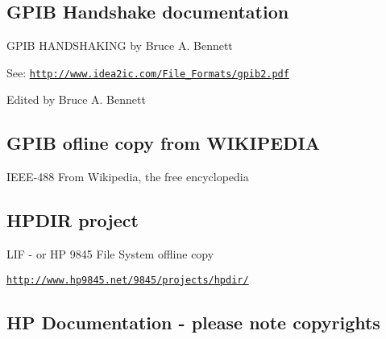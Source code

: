 \subsection*{G\+P\+IB Handshake documentation}


\begin{DoxyItemize}
\item G\+P\+IB H\+A\+N\+D\+S\+H\+A\+K\+I\+NG by Bruce A. Bennett
\begin{DoxyItemize}
\item See\+: \href{http://www.idea2ic.com/File_Formats/gpib2.pdf}{\tt http\+://www.\+idea2ic.\+com/\+File\+\_\+\+Formats/gpib2.\+pdf}
\begin{DoxyItemize}
\item Edited by Bruce A. Bennett 


\end{DoxyItemize}
\end{DoxyItemize}
\end{DoxyItemize}

\subsection*{G\+P\+IB ofline copy from W\+I\+K\+I\+P\+E\+D\+IA}


\begin{DoxyItemize}
\item I\+E\+E\+E-\/488 From Wikipedia, the free encyclopedia 


\end{DoxyItemize}

\subsection*{H\+P\+D\+IR project}


\begin{DoxyItemize}
\item L\+IF -\/ or HP 9845 File System offline copy
\begin{DoxyItemize}
\item \href{http://www.hp9845.net/9845/projects/hpdir/}{\tt http\+://www.\+hp9845.\+net/9845/projects/hpdir/} 


\end{DoxyItemize}
\end{DoxyItemize}

\subsection*{HP Documentation -\/ please note copyrights}


